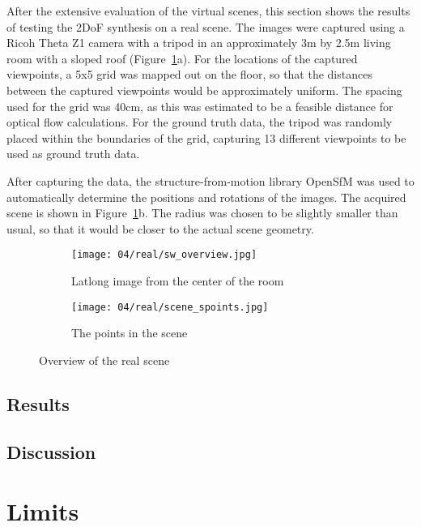 After the extensive evaluation of the virtual scenes, this section shows the results of testing the 2DoF synthesis on a real scene. The images were captured using a Ricoh Theta Z1 camera with a tripod in an approximately 3m by 2.5m living room with a sloped roof (Figure~\ref{fig:real_setup}a). For the locations of the captured viewpoints, a 5x5 grid was mapped out on the floor, so that the distances between the captured viewpoints would be approximately uniform. The spacing used for the grid was 40cm, as this was estimated to be a feasible distance for optical flow calculations. For the ground truth data, the tripod was randomly placed within the boundaries of the grid, capturing 13 different viewpoints to be used as ground truth data.

After capturing the data, the structure-from-motion library OpenSfM \cite{opensfm} was used to automatically determine the positions and rotations of the images. The acquired scene is shown in Figure~\ref{fig:real_setup}b. The radius was chosen to be slightly smaller than usual, so that it would be closer to the actual scene geometry.

\begin{figure}[p]
\centering
    \hfill
    \begin{subfigure}[b]{0.7\textwidth}
            \centering
            \texttt{[image: 04/real/sw\_overview.jpg]}
            \caption{Latlong image from the center of the room}
    \end{subfigure}
    \hfill
    \begin{subfigure}[b]{0.25\textwidth}
            \centering
            \texttt{[image: 04/real/scene\_spoints.jpg]}
            \caption{The points in the scene}
    \end{subfigure}
    \hfill
  \caption{Overview of the real scene}
  \label{fig:real_setup}
\end{figure}

\subsection{Results}

\subsection{Discussion}


\section{Limits}

